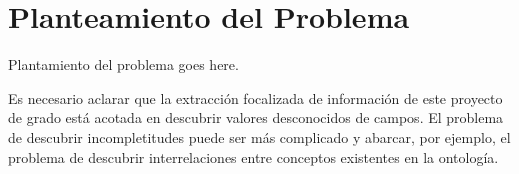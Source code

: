 \chapter{Planteamiento del Problema} \label{chap:planteamientoProblema}

Plantamiento del problema goes here.

Es necesario aclarar que la extracción focalizada de información de este proyecto de grado está acotada en descubrir valores desconocidos de campos. El problema de descubrir incompletitudes puede ser más complicado y abarcar, por ejemplo, el problema de descubrir interrelaciones entre conceptos existentes en la ontología. 